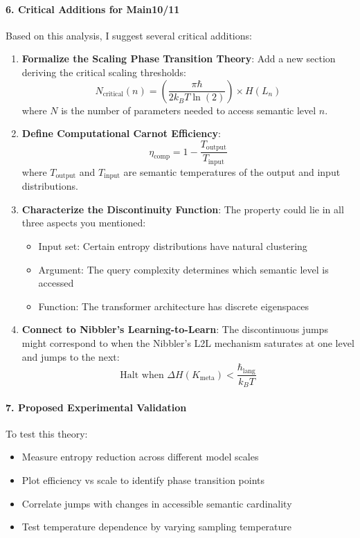\documentclass[11pt,letterpaper]{article}
\begin{document}
\paragraph{6. Critical Additions for Main10/11}
Based on this analysis, I suggest several critical additions:
\begin{enumerate}
    \item \textbf{Formalize the Scaling Phase Transition Theory}: Add a new section deriving the critical scaling thresholds:
    \[
    N_{\text{critical}}(n) = \left( \frac{\pi \hbar}{2k_B T \ln(2)} \right) \times H(L_n)
    \]
    where $N$ is the number of parameters needed to access semantic level $n$.
    \item \textbf{Define Computational Carnot Efficiency}:
    \[
    \eta_{\text{comp}} = 1 - \frac{T_{\text{output}}}{T_{\text{input}}}
    \]
    where $T_{\text{output}}$ and $T_{\text{input}}$ are semantic temperatures of the output and input distributions.
    \item \textbf{Characterize the Discontinuity Function}: The property could lie in all three aspects you mentioned:
    \begin{itemize}
        \item Input set: Certain entropy distributions have natural clustering
        \item Argument: The query complexity determines which semantic level is accessed
        \item Function: The transformer architecture has discrete eigenspaces
    \end{itemize}
    \item \textbf{Connect to Nibbler's Learning-to-Learn}: The discontinuous jumps might correspond to when the Nibbler's L2L mechanism saturates at one level and jumps to the next:
    \[
    \text{Halt when } \Delta H(K_{\text{meta}}) < \frac{\hbar_{\text{lang}}}{k_B T}
    \]
\end{enumerate}

\paragraph{7. Proposed Experimental Validation}
To test this theory:
\begin{itemize}
    \item Measure entropy reduction across different model scales
    \item Plot efficiency vs scale to identify phase transition points
    \item Correlate jumps with changes in accessible semantic cardinality
    \item Test temperature dependence by varying sampling temperature
\end{itemize}
\end{document}
